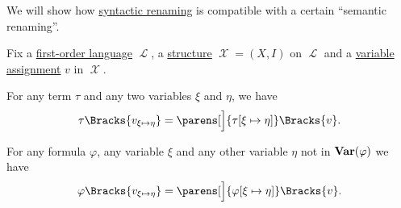 \begin{proposition}\label{thm:renaming_assignment_compatibility}
  We will show how \hyperref[rem:first_order_substitution_renaming_justification]{syntactic renaming} is compatible with a certain \enquote{semantic renaming}.

  Fix a \hyperref[def:first_order_syntax]{first-order language} \( \mscrL \), a \hyperref[def:first_order_structure]{structure} \( \mscrX = (X, I) \) on \( \mscrL \) and a \hyperref[def:first_order_valuation/variable_assignment]{variable assignment} \( v \) in \( \mscrX \).

  \begin{thmenum}
     For any term \( \tau \) and any two variables \( \xi \) and \( \eta \), we have
    \begin{equation}\label{eq:thm:renaming_assignment_compatibility/terms}
      \tau\Bracks{v_{\xi \mapsto \eta}}
      =
      \parens[\Big]{ \tau[\xi \mapsto \eta] }\Bracks{v}.
    \end{equation}

     For any formula \( \varphi \), any variable \( \xi \) and any other variable \( \eta \) not in \( \operatorname{\mathbf{Var}}(\varphi) \) we have
    \begin{equation}\label{eq:thm:renaming_assignment_compatibility/formulas}
      \varphi\Bracks{v_{\xi \mapsto \eta}}
      =
      \parens[\Big]{ \varphi[\xi \mapsto \eta] }\Bracks{v}.
    \end{equation}
  \end{thmenum}
\end{proposition}
